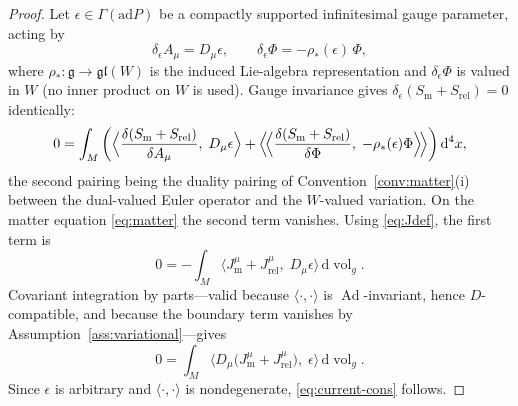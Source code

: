 \documentclass[11pt,a4paper]{article}
\theoremstyle{plain}
\theoremstyle{definition}
\theoremstyle{remark}
\newcommand{\gfrak}{\mathfrak{g}}
\newcommand{\Ad}{\operatorname{Ad}}
\newcommand{\dvol}{\mathrm{d}\!\operatorname{vol}_g}
\begin{document}
\begin{proof}
Let $\epsilon\in\Gamma(\mathrm{ad}P)$ be a compactly supported infinitesimal gauge parameter, acting
by
\begin{equation}
\label{eq:inf-gauge}
\delta_\epsilon A_\mu=D_\mu\epsilon,
\qquad
\delta_\epsilon\Phi=-\rho_*(\epsilon)\,\Phi ,
\end{equation}
where $\rho_*\colon\gfrak\to\mathfrak{gl}(W)$ is the induced Lie-algebra representation and
$\delta_\epsilon\Phi$ is valued in $W$ (no inner product on $W$ is used). Gauge invariance gives
$\delta_\epsilon(S_{\mathrm{m}}+S_{\mathrm{rel}})=0$ identically:
\[
0=\int_M\left(
\Bigl\langle\frac{\delta (S_{\mathrm{m}}+S_{\mathrm{rel}})}{\delta A_\mu},\;D_\mu\epsilon\Bigr\rangle
+\Bigl\langle\!\Bigl\langle
\frac{\delta (S_{\mathrm{m}}+S_{\mathrm{rel}})}{\delta \Phi},\;-\rho_*(\epsilon)\Phi
\Bigr\rangle\!\Bigr\rangle
\right)\mathrm{d}^4x ,
\]
the second pairing being the duality pairing of Convention~\ref{conv:matter}(i) between the
dual-valued Euler operator and the $W$-valued variation. On the matter equation \eqref{eq:matter} the
second term vanishes. Using \eqref{eq:Jdef}, the first term is
\[
0=-\int_M\bigl\langle J^{\mu}_{\mathrm{m}}+J^{\mu}_{\mathrm{rel}},\;D_\mu\epsilon\bigr\rangle\,\dvol .
\]
Covariant integration by parts---valid because $\langle\cdot,\cdot\rangle$ is $\Ad$-invariant, hence
$D$-compatible, and because the boundary term vanishes by Assumption~\ref{ass:variational}---gives
\[
0=\int_M\bigl\langle D_\mu\bigl(J^{\mu}_{\mathrm{m}}+J^{\mu}_{\mathrm{rel}}\bigr),\;
\epsilon\bigr\rangle\,\dvol .
\]
Since $\epsilon$ is arbitrary and $\langle\cdot,\cdot\rangle$ is nondegenerate,
\eqref{eq:current-cons} follows.
\end{proof}
\end{document}
